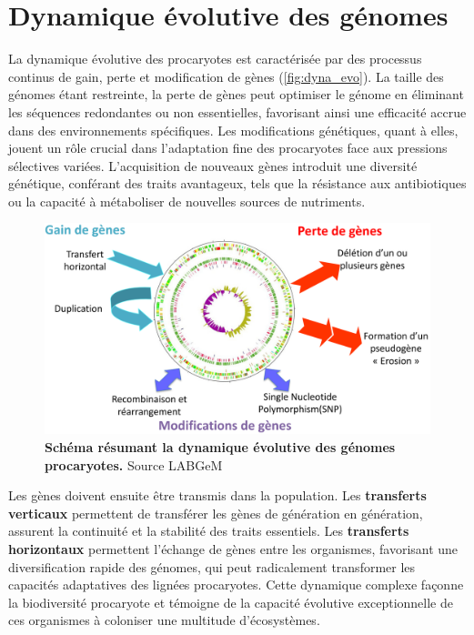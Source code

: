 \newpage
\section{Dynamique évolutive des génomes}
\label{sec:dyn_evo}

La dynamique évolutive des procaryotes est caractérisée par des processus continus de gain, perte et modification de gènes (\autoref{fig:dyna_evo}). La taille des génomes étant restreinte, la perte de gènes peut optimiser le génome en éliminant les séquences redondantes ou non essentielles, favorisant ainsi une efficacité accrue dans des environnements spécifiques. Les modifications génétiques, quant à elles, jouent un rôle crucial dans l'adaptation fine des procaryotes face aux pressions sélectives variées. L’acquisition de nouveaux gènes introduit une diversité génétique, conférant des traits avantageux, tels que la résistance aux antibiotiques ou la capacité à métaboliser de nouvelles sources de nutriments.

\begin{figure}[htbp]
    \centering
    \includegraphics[width=\linewidth]{images/DynamiqueEvo.png}
    \caption[Schéma de la dynamique évolutive des génomes procaryotes]{\textbf{Schéma résumant la dynamique évolutive des génomes procaryotes.} Source LABGeM}
    \label{fig:dyna_evo}
\end{figure}

 Les gènes doivent ensuite être transmis dans la population. Les \textbf{transferts verticaux} permettent de transférer les gènes de génération en génération, assurent la continuité et la stabilité des traits essentiels. Les \textbf{transferts horizontaux} permettent l'échange de gènes entre les organismes, favorisant une diversification rapide des génomes, qui peut radicalement transformer les capacités adaptatives des lignées procaryotes. Cette dynamique complexe façonne la biodiversité procaryote et témoigne de la capacité évolutive exceptionnelle de ces organismes à coloniser une multitude d'écosystèmes.

